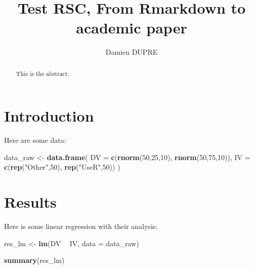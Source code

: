 \documentclass[]{elsarticle} %
\newenvironment{Shaded}{\begin{snugshade}}{\end{snugshade}}
\newcommand{\DataTypeTok}[1]{\textcolor[rgb]{0.13,0.29,0.53}{#1}}
\newcommand{\DecValTok}[1]{\textcolor[rgb]{0.00,0.00,0.81}{#1}}
\newcommand{\KeywordTok}[1]{\textcolor[rgb]{0.13,0.29,0.53}{\textbf{#1}}}
\newcommand{\NormalTok}[1]{#1}
\newcommand{\OperatorTok}[1]{\textcolor[rgb]{0.81,0.36,0.00}{\textbf{#1}}}
\newcommand{\StringTok}[1]{\textcolor[rgb]{0.31,0.60,0.02}{#1}}
\begin{document}
\begin{frontmatter}

  \title{Test RSC, From Rmarkdown to academic paper}
    \author[Dublin City University]{Damien DUPRE}
      \address[Dublin City University]{Dublin, Ireland}
  
  \begin{abstract}
  This is the abstract.
  \end{abstract}
  
 \end{frontmatter}

\hypertarget{introduction}{%
\section{Introduction}\label{introduction}}

Here are some data:

\begin{Shaded}
\begin{Highlighting}[]
\NormalTok{data_raw <-}\StringTok{ }\KeywordTok{data.frame}\NormalTok{(}
  \DataTypeTok{DV =} \KeywordTok{c}\NormalTok{(}\KeywordTok{rnorm}\NormalTok{(}\DecValTok{50}\NormalTok{,}\DecValTok{25}\NormalTok{,}\DecValTok{10}\NormalTok{), }\KeywordTok{rnorm}\NormalTok{(}\DecValTok{50}\NormalTok{,}\DecValTok{75}\NormalTok{,}\DecValTok{10}\NormalTok{)),}
  \DataTypeTok{IV =} \KeywordTok{c}\NormalTok{(}\KeywordTok{rep}\NormalTok{(}\StringTok{"Other"}\NormalTok{,}\DecValTok{50}\NormalTok{), }\KeywordTok{rep}\NormalTok{(}\StringTok{"UseR"}\NormalTok{,}\DecValTok{50}\NormalTok{))}
\NormalTok{  )}
\end{Highlighting}
\end{Shaded}

\hypertarget{results}{%
\section{Results}\label{results}}

Here is some linear regression with their analysis:

\begin{Shaded}
\begin{Highlighting}[]
\NormalTok{res_lm <-}\StringTok{ }\KeywordTok{lm}\NormalTok{(DV }\OperatorTok{~}\StringTok{ }\NormalTok{IV, }\DataTypeTok{data =}\NormalTok{ data_raw)}

\KeywordTok{summary}\NormalTok{(res_lm)}
\end{Highlighting}
\end{Shaded}
\end{document}
